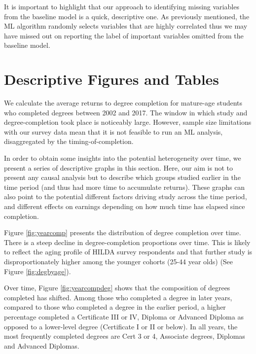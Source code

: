 \documentclass[12pt, a4paper]{article}
\begin{document}
It is important to highlight that our approach to identifying missing variables
from the baseline model is a quick, descriptive one. As previously mentioned,
the ML algorithm randomly selects variables that are highly correlated thus we
may have missed out on reporting the label of important variables omitted from
the baseline model.


\section{Descriptive Figures and Tables}

We calculate the average returns to degree completion for mature-age students who completed degrees between 2002 and 2017. The window in which study and degree-completion took place is noticeably large. However, sample size limitations with our survey data mean that it is not feasible to run an ML analysis, disaggregated by the timing-of-completion.

In order to obtain some insights into the potential heterogeneity over time, we present a series of descriptive graphs in this section. Here, our aim is not to present any causal analysis but to describe which groups studied earlier in the time period (and thus had more time to accumulate returns). These graphs can also point to the potential different factors driving study across the time period, and different effects on earnings depending on how much time has elapsed since completion. 

Figure \ref{fig:yearcomp} presents the distribution of degree completion over time. There is a steep decline in degree-completion proportions over time. This is likely to reflect the aging profile of HILDA survey respondents and that further study is disproportionately higher among the younger cohorts (25-44 year olds) (See Figure \ref{fig:degbyage}).

Over time, Figure \ref{fig:yearcompdeg} shows that the composition of degrees completed has shifted. Among those who completed a degree in later years, compared to those who completed a degree in the earlier period, a higher percentage completed a Certificate III or IV, Diploma or Advanced Diploma as opposed to a lower-level degree (Certificate I or II or below). In all years, the most frequently completed degrees are Cert 3 or 4, Associate degrees, Diplomas and Advanced Diplomas. 

\end{document}
